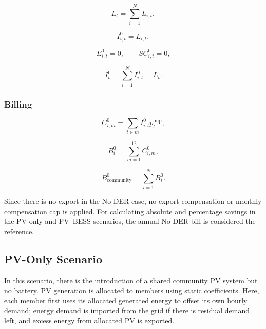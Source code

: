 \begin{equation}
\label{eq:aggregate_load}
L_t = \sum_{i=1}^{N} L_{i,t},
\end{equation}

\begin{equation}
\label{eq:no_der_import_member}
I^0_{i,t} = L_{i,t},
\end{equation}

\begin{equation}
\label{eq:no_der_export_self_consumption}
E^0_{i,t} = 0, \qquad SC^0_{i,t} = 0,
\end{equation}

\begin{equation}
\label{eq:no_der_import_total}
I^0_t = \sum_{i=1}^{N} I^0_{i,t} = L_t.
\end{equation}

\subsubsection{Billing}
\label{subsec:no_der_billing}

\begin{equation}
\label{eq:no_der_monthly_cost}
C^0_{i,m} = \sum_{t \in m} I^0_{i,t} p^{\mathrm{imp}}_t,
\end{equation}

\begin{equation}
\label{eq:no_der_annual_bill_member}
B^0_i = \sum_{m=1}^{12} C^0_{i,m},
\end{equation}

\begin{equation}
\label{eq:no_der_annual_bill_community}
B^0_{\mathrm{community}} = \sum_{i=1}^{N} B^0_i.
\end{equation}

Since there is no export in the No-DER case, no export compensation or monthly compensation cap is applied. For calculating absolute and percentage savings in the PV-only and PV--BESS scenarios, the annual No-DER bill is considered the reference.

\subsection{PV-Only Scenario}
\label{sec:pv_only_scenario_ch4}

In this scenario, there is the introduction of a shared community PV system but no battery. PV generation is allocated to members using static coefficients. Here, each member first uses its allocated generated energy to offset its own hourly demand; energy demand is imported from the grid if there is residual demand left, and excess energy from allocated PV is exported.

